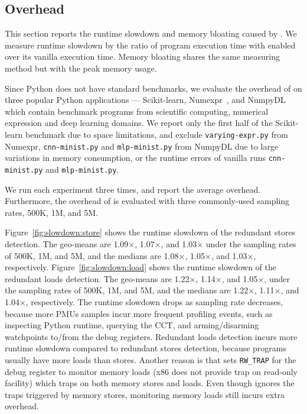 \subsection{Overhead}

This section reports the runtime slowdown and memory bloating caused by \tool. We measure runtime slowdown by the ratio of program execution time with \tool enabled over its vanilla execution time. Memory bloating shares the same measuring method but with the peak memory usage. %

Since Python does not have standard benchmarks, we evaluate the overhead of \tool on three popular Python applications --- Scikit-learn, Numexpr~\cite{numexpr}, and NumpyDL~\cite{numpydl} which contain benchmark programs from scientific computing, numerical expression and deep learning domains. We report only the first half of the Scikit-learn benchmark due to space limitations, and exclude {\tt varying-expr.py} from Numexpr, {\tt cnn-minist.py} and {\tt mlp-minist.py} from NumpyDL due to large variations in memory consumption, or the runtime errors of vanilla runs {\tt cnn-minist.py} and {\tt mlp-minist.py}.





We run each experiment three times, and report the average overhead. Furthermore, the overhead of \tool is evaluated with three commonly-used sampling rates, 500K, 1M, and 5M.

Figure~\ref{fig:slowdown:store} shows the runtime slowdown of the redundant stores detection. The geo-means are 1.09$\times$, 1.07$\times$, and 1.03$\times$ under the sampling rates of 500K, 1M, and 5M, and the medians are 1.08$\times$, 1.05$\times$, and 1.03$\times$, respectively. Figure~\ref{fig:slowdown:load} shows the runtime slowdown of the redundant loads detection. The geo-means are 1.22$\times$, 1.14$\times$, and 1.05$\times$, under the sampling rates of 500K, 1M, and 5M, and the medians are 1.22$\times$, 1.11$\times$, and 1.04$\times$, respectively. The runtime slowdown drops as sampling rate decreases, because more PMUs samples incur more frequent profiling events, such as inspecting Python runtime, querying the CCT, and arming/disarming watchpoints to/from the debug registers. Redundant loads detection incurs more runtime slowdown compared to redundant stores detection, because programs usually have more loads than stores. Another reason is that \tool sets {\tt RW\_TRAP} for the debug register to monitor memory loads (x86 does not provide trap on read-only facility) which traps on both memory stores and loads. Even though \tool ignores the traps triggered by memory stores, monitoring memory loads still incurs extra overhead.

